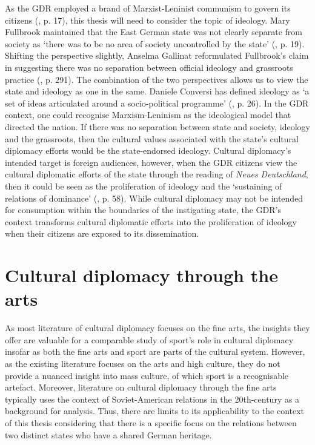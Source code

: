 As the GDR employed a brand of Marxist-Leninist communism to govern its citizens (\cite{grixcooke2002}, p. 17), this thesis will need to consider the topic of ideology. Mary Fullbrook maintained that the East German state was not clearly separate from society as ‘there was to be no area of society uncontrolled by the state’ (\citeyear{fullbrook1995}, p. 19). Shifting the perspective slightly, Anselma Gallinat reformulated Fullbrook’s claim in suggesting there was no separation between official ideology and grassroots practice (\citeyear{gallinat2005}, p. 291). The combination of the two perspectives allows us to view the state and ideology as one in the same. Daniele Conversi has defined ideology as ‘a set of ideas articulated around a socio-political programme’ (\citeyear{conversi2010}, p. 26). In the GDR context, one could recognise Marxism-Leninism as the ideological model that directed the nation. If there was no separation between state and society, ideology and the grassroots, then the cultural values associated with the state’s cultural diplomacy efforts would be the state-endorsed ideology. Cultural diplomacy’s intended target is foreign audiences, however, when the GDR citizens view the cultural diplomatic efforts of the state through the reading of \textit{Neues Deutschland}, then it could be seen as the proliferation of ideology and the ‘sustaining of relations of dominance’ (\cite{thompson1990}, p. 58). While cultural diplomacy may not be intended for consumption within the boundaries of the instigating state, the GDR’s context transforms cultural diplomatic efforts into the proliferation of ideology when their citizens are exposed to its dissemination.

\section{Cultural diplomacy through the arts}

As most literature of cultural diplomacy focuses on the fine arts, the insights they offer are valuable for a comparable study of sport’s role in cultural diplomacy insofar as both the fine arts and sport are parts of the cultural system. However, as the existing literature focuses on the arts and high culture, they do not provide a nuanced insight into mass culture, of which sport is a recognisable artefact. Moreover, literature on cultural diplomacy through the fine arts typically uses the context of Soviet-American relations in the 20th-century as a background for analysis. Thus, there are limits to its applicability to the context of this thesis considering that there is a specific focus on the relations between two distinct states who have a shared German heritage.


